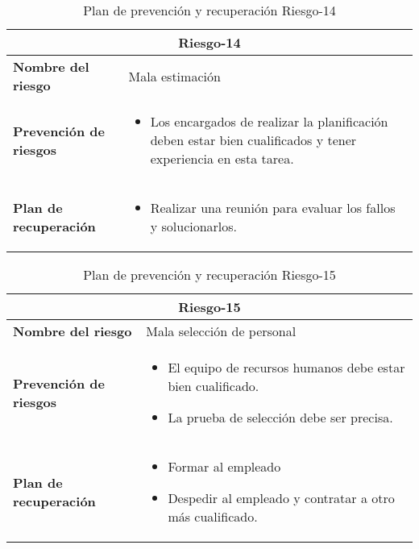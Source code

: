 \begin{table}[H]
\begin{center}
\begin{tabular}{p{} p{10cm}}
\multicolumn{2}{c}{\textbf{Riesgo-14} } \\
\hline \hline
\textbf{Nombre del riesgo} & Mala estimación  \\
\hline
\textbf{Prevención de riesgos} & \begin{itemize}[-]
  \item Los encargados de realizar la planificación deben estar bien cualificados y tener experiencia en esta tarea.
  \end{itemize} \\
\hline
\textbf{Plan de recuperación} &   \begin{itemize}[-]
  \item Realizar una reunión para evaluar los fallos y solucionarlos.
  \end{itemize}\\
\hline
\end{tabular}
\caption{Plan de prevención y recuperación Riesgo-14}
\label{tab:Riesgo-14-Prev_Recup}
\end{center}
\end{table}

\begin{table}[H]
\begin{center}
\begin{tabular}{p{} p{10cm}}
\multicolumn{2}{c}{\textbf{Riesgo-15} } \\
\hline \hline
\textbf{Nombre del riesgo} & Mala selección de personal \\
\hline
\textbf{Prevención de riesgos} & \begin{itemize}[-]
  \item El equipo de recursos humanos debe estar bien cualificado.
  \item La prueba de selección debe ser precisa.
  \end{itemize} \\
\hline
\textbf{Plan de recuperación} &   \begin{itemize}[-]
  \item Formar al empleado
  \item Despedir al empleado y contratar a otro más cualificado.
  \end{itemize}\\
\hline
\end{tabular}
\caption{Plan de prevención y recuperación Riesgo-15}
\label{tab:Riesgo-15-Prev_Recup}
\end{center}
\end{table}

